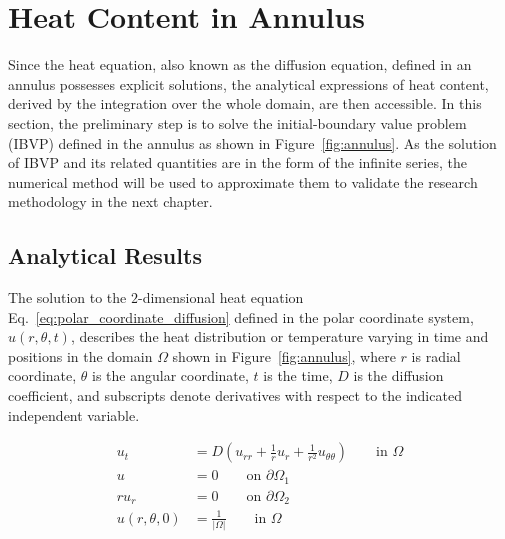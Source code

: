 
\section{Heat Content in Annulus}

Since the heat equation, also known as the diffusion equation, defined
in an annulus possesses explicit solutions, the analytical expressions
of heat content, derived by the integration over the whole domain, are
then accessible. In this section, the preliminary step is to solve the
initial-boundary value problem (IBVP) defined in the annulus as shown
in Figure~\ref{fig:annulus}. As the solution of IBVP and its related
quantities are in the form of the infinite series, the numerical
method will be used to approximate them to validate the research
methodology in the next chapter.


\newcommand{\uold}{u(r, \theta, t)} %
\newcommand{\unew}{u(\hat r, \theta, \tau)} %
\newcommand{\udf}[1]{\ensuremath{u_{#1}}} 
\newcommand{\uds}[2]{\ensuremath{u_{#1#2}}}


\subsection{Analytical Results}\label{analytical results}


The solution to the $2$-dimensional heat equation
\cite{crank1979mathematics} Eq.~\ref{eq:polar_coordinate_diffusion}
defined in the polar coordinate system, $\uold$, describes
the heat distribution or temperature varying in time and positions in
the domain $\Omega$ shown in Figure~\ref{fig:annulus}, where $r$ is
radial coordinate, $\theta$ is the angular coordinate, $t$ is the
time, $D$ is the diffusion coefficient, and subscripts denote
derivatives with respect to the indicated independent variable.


\begin{align}
  \udf{t} & = D\left(\uds{r}{r} + \frac{1}{r} \udf{r} + \frac{1}{r^2} \uds{\theta}{\theta}\right)
  \qquad\text{in $\Omega$}\label{eq:polar_coordinate_diffusion} \\
  u & = 0
  \qquad\text{on $\partial \Omega_1$}\label{eq:Dirichlet_bc} \\
  r\udf{r} & = 0 %
  \qquad\text{on $\partial \Omega_2$}\label{eq:Neumann_bc} \\
  u(r, \theta, 0) & = \frac{1}{|\Omega|}
  \qquad\text{in $\Omega$}\label{eq:initial_cd}  
\end{align}

